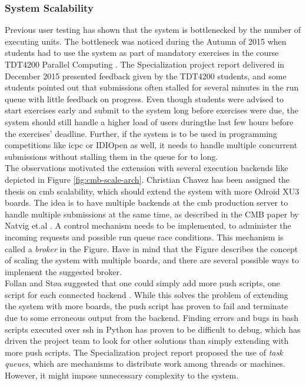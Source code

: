 \subsubsection{System Scalability}
Previous user testing has shown that the system is bottlenecked by the number of executing units. The bottleneck was noticed during the Autumn of 2015 when students had to use the system as part of mandatory exercises in the course TDT4200 Parallel Computing \cite{TDT4200}. The Specialization project report delivered in December 2015 presented feedback given by the TDT4200 students, and some students pointed out that submissions often stalled for several minutes in the run queue with little feedback on progress. Even though students were advised to start exercises early and submit to the system long before exercises were due, the system should still handle a higher load of users duringthe last few hours before the exercises' deadline. Further, if the system is to be used in programming competitions like \gls{icpc} \cite{ICPC} or IDIOpen \cite{IDIOPEN} as well, it needs to handle multiple concurrent submissions without stalling them in the queue for to long. \\

The observations motivated the extension with several execution backends like depicted in Figure \ref{fig:cmb-scale-arch}. Christian Chavez has been assigned the thesis on \gls{cmb} scalability, which should extend the system with more Odroid XU3 boards. The idea is to have multiple backends at the \gls{cmb} production server to handle multiple submissions at the same time, as described in the CMB paper by Natvig et.al \cite{a:CMB}. A control mechanism needs to be implemented, to administer the incoming requests and possible run queue race conditions. This mechanism is called a \textit{broker} in the Figure. Have in mind that the Figure describes the concept of scaling the system with multiple boards, and there are several possible ways to implement the suggested broker. \\

Follan and Støa suggested that one could simply add more push scripts, one script for each connected backend \cite{mt:T&S}. While this solves the problem of extending the system with more boards, the push script has proven to fail and terminate due to some erroneous output from the backend. Finding errors and bugs in bash scripts executed over \gls{ssh} in Python has proven to be difficult to debug, which has driven the project team to look for other solutions than simply extending with more push scripts. The Specialization project report proposed the use of \textit{task queues}, which are mechanisms to distribute work among threads or machines. However, it might impose unnecessary complexity to the system.  \\

